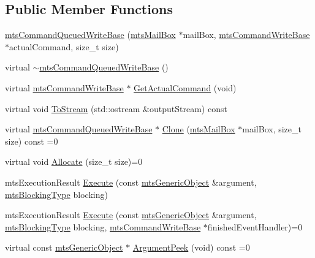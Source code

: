\subsection*{Public Member Functions}
\begin{DoxyCompactItemize}
\item 
\hyperlink{classmts_command_queued_write_base_a3acce98115e1e2ebc41079f22ed1b30e}{mts\+Command\+Queued\+Write\+Base} (\hyperlink{classmts_mail_box}{mts\+Mail\+Box} $\ast$mail\+Box, \hyperlink{classmts_command_write_base}{mts\+Command\+Write\+Base} $\ast$actual\+Command, size\+\_\+t size)
\item 
virtual \hyperlink{classmts_command_queued_write_base_a67b0676e10efe628b44930d9b5a1f12f}{$\sim$mts\+Command\+Queued\+Write\+Base} ()
\item 
virtual \hyperlink{classmts_command_write_base}{mts\+Command\+Write\+Base} $\ast$ \hyperlink{classmts_command_queued_write_base_a7e97a8a3bc60fca2ba15bd335a8838b6}{Get\+Actual\+Command} (void)
\item 
virtual void \hyperlink{classmts_command_queued_write_base_a8c3b9a68b2f3067d1e4974f963fd9d23}{To\+Stream} (std\+::ostream \&output\+Stream) const 
\item 
virtual \hyperlink{classmts_command_queued_write_base}{mts\+Command\+Queued\+Write\+Base} $\ast$ \hyperlink{classmts_command_queued_write_base_af5ad182c80a9c5660d9da1afa425f417}{Clone} (\hyperlink{classmts_mail_box}{mts\+Mail\+Box} $\ast$mail\+Box, size\+\_\+t size) const =0
\item 
virtual void \hyperlink{classmts_command_queued_write_base_a4c913b692d849b9aa47f3c9ea235cd8f}{Allocate} (size\+\_\+t size)=0
\item 
mts\+Execution\+Result \hyperlink{classmts_command_queued_write_base_a6d7fa71986aac29927898583c4c1f1f9}{Execute} (const \hyperlink{classmts_generic_object}{mts\+Generic\+Object} \&argument, \hyperlink{mts_forward_declarations_8h_ad7426ccb6c883bc780d0ee197dddcbe7}{mts\+Blocking\+Type} blocking)
\item 
mts\+Execution\+Result \hyperlink{classmts_command_queued_write_base_af7ee7e7dd5d775d48ff191661ae7c376}{Execute} (const \hyperlink{classmts_generic_object}{mts\+Generic\+Object} \&argument, \hyperlink{mts_forward_declarations_8h_ad7426ccb6c883bc780d0ee197dddcbe7}{mts\+Blocking\+Type} blocking, \hyperlink{classmts_command_write_base}{mts\+Command\+Write\+Base} $\ast$finished\+Event\+Handler)=0
\item 
virtual const \hyperlink{classmts_generic_object}{mts\+Generic\+Object} $\ast$ \hyperlink{classmts_command_queued_write_base_a40aee70e67c7415127e72be05eb6a3a4}{Argument\+Peek} (void) const =0

\end{DoxyCompactItemize}
